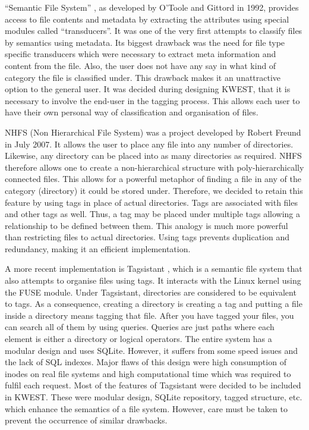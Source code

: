 ``Semantic File System''\cite{SEMFS} , as developed by O'Toole and Gittord in 1992, provides
access to file contents and metadata by extracting the attributes using special modules
called ``transducers''. It was one of the very first attempts to classify files by semantics
using metadata. Its biggest drawback was the need for file type specific transducers
which were necessary to extract meta information and content from the file. Also, the
user does not have any say in what kind of category the file is classified under. This
drawback makes it an unattractive option to the general user. It was decided during
designing KWEST, that it is necessary to involve the end-user in the tagging process. This
allows each user to have their own personal way of classification and organisation of
files.

NHFS (Non Hierarchical File System)\cite{NHFS} was a project developed by Robert Freund
in July 2007. It allows the user to place any file into any number of directories. Likewise,
any directory can be placed into as many directories as required. NHFS therefore allows
one to create a non-hierarchical structure with poly-hierarchically connected files. This
allows for a powerful metaphor of finding a file in any of the category (directory) it could
be stored under. Therefore, we decided to retain this feature by using tags in place of
actual directories. Tags are associated with files and other tags as well. Thus, a tag may
be placed under multiple tags allowing a relationship to be defined between them. This
analogy is much more powerful than restricting files to actual directories. Using tags
prevents duplication and redundancy, making it an efficient implementation.

A more recent implementation is Tagsistant\cite{TAGSISTANT} , which is a semantic file system that
also attempts to organise files using tags. It interacts with the Linux kernel using the
FUSE module. Under Tagsistant, directories are considered to be equivalent to tags. As
a consequence, creating a directory is creating a tag and putting a file inside a directory
means tagging that file. After you have tagged your files, you can search all of them by
using queries. Queries are just paths where each element is either a directory or logical
operators. The entire system has a modular design and uses SQLite. However, it suffers
from some speed issues and the lack of SQL indexes. Major flaws of this design were
high consumption of inodes on real file systems and high computational time which was
required to fulfil each request. Most of the features of Tagsistant were decided to be
included in KWEST. These were modular design, SQLite repository, tagged structure, etc.
which enhance the semantics of a file system. However, care must be taken to prevent
the occurrence of similar drawbacks.

